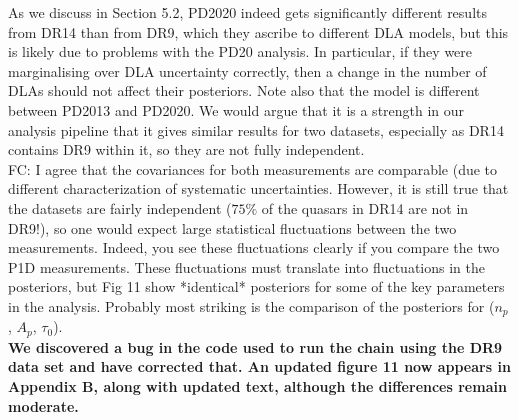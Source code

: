 \documentclass[12pt]{article}
\begin{document}
As we discuss in Section 5.2, PD2020 indeed gets significantly different results from DR14 than from DR9, which they ascribe to different DLA models, but this is likely due to problems with the PD20 analysis. In particular, if they were marginalising over DLA uncertainty correctly, then a change in the number of DLAs should not affect their posteriors. Note also that the model is different between PD2013 and PD2020.  We would argue that it is a strength in our analysis pipeline that it gives similar results for two datasets, especially as DR14 contains DR9 within it, so they are not fully independent.\\

FC: I agree that the covariances for both measurements are comparable (due to different characterization of systematic uncertainties. However, it is still true that the datasets are fairly independent ($75\%$ of the quasars in DR14 are not in DR9!), so one would expect large statistical fluctuations between the two measurements. Indeed, you see these fluctuations clearly if you compare the two P1D measurements. These fluctuations must translate into fluctuations in the posteriors, but Fig 11 show *identical* posteriors for some of the key parameters in the analysis. Probably most striking is the comparison of the posteriors for ($n_p$, $A_p$, $\tau_0$).\\

\textbf{We discovered a bug in the code used to run the chain using the DR9 data set and have corrected that. An updated figure 11 now appears in Appendix B, along with updated text, although the differences remain moderate.}
\end{document}
